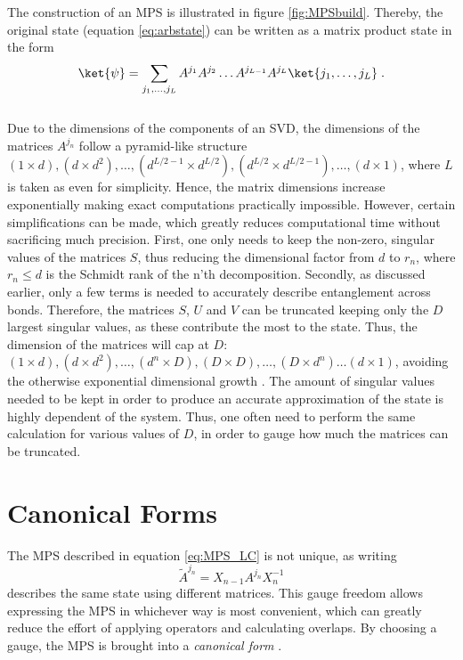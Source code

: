 The construction of an MPS is illustrated in figure \ref{fig:MPSbuild}. Thereby, the original state (equation \ref{eq:arbstate}) can be written as a matrix product state in the form \cite{schollwock}
\begin{equation}
	\ket{\psi} = \sum_{j_1, \ldots, j_L} A^{j_1} A^{j_2} \ldots A^{j_{L-1}} A^{j_{L}} \ket{j_1, \ldots, j_L} \; .
	\label{eq:MPS_LC} 
\end{equation}
\\
Due to the dimensions of the components of an SVD, the dimensions of the matrices $A^{j_n}$ follow a pyramid-like structure $(1 \times d ),(d \times d^2) , \ldots , (d^{L/2 -1} \times d^{L/2}) , (d^{L/2} \times d^{L/2 -1 }), \ldots , (d \times 1)$, where $L$ is taken as even for simplicity. Hence, the matrix dimensions increase exponentially making exact computations practically impossible. However, certain simplifications can be made, which greatly reduces computational time without sacrificing much precision. First, one only needs to keep the non-zero, singular values of the matrices $S$, thus reducing the dimensional factor from $d$ to $r_n$, where $r_n \leq d$ is the Schmidt rank of the n'th decomposition. Secondly, as discussed earlier, only a few terms is needed to accurately describe entanglement across bonds. Therefore, the matrices $S$, $U$ and $V$ can be truncated keeping only the $D$ largest singular values, as these contribute the most to the state. Thus, the dimension of the matrices will cap at $D$: $(1 \times d ),(d \times d^2) , \ldots , (d^{n} \times D) , (D \times D), \ldots , ( D \times d^{n}) \ldots  (d \times 1)$, avoiding the otherwise exponential dimensional growth \cite{EntropyScaling}. The amount of singular values needed to be kept in order to produce an accurate approximation of the state is highly dependent of the system. Thus, one often need to perform the same calculation for various values of $D$, in order to gauge how much the matrices can be truncated.


\section{Canonical Forms}
\label{sec:canonical}
The MPS described in equation \ref{eq:MPS_LC} is not unique, as writing 
\begin{equation}
	\tilde{A}^{j_n} = X_{n-1} A^{j_n} X_{n}^{-1}
\end{equation}
describes the same state using different matrices. This gauge freedom allows expressing the MPS in whichever way is most convenient, which can greatly reduce the effort of applying operators and calculating overlaps. By choosing a gauge, the MPS is brought into a \textit{canonical form} \cite{Vidal2007}.

